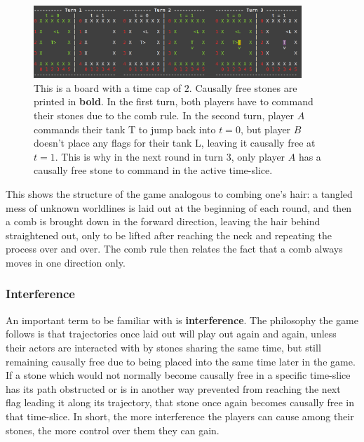 \documentclass[12pt]{article}
\begin{document}
	\begin{figure}[h]
\begin{center}

    \includegraphics[width=0.9\textwidth]{images/diag_rule_of_combing}
 \caption{This is a board with a time cap of $2$. Causally free stones are printed in \textbf{bold}. In the first turn, both players have to command their stones due to the comb rule. In the second turn, player $A$ commands their tank T to jump back into $t=0$, but player $B$ doesn't place any flags for their tank L, leaving it causally free at $t=1$. This is why in the next round in turn 3, only player $A$ has a causally free stone to command in the active time-slice.}\label{fig:comb rule}
\end{center}
\end{figure}
	
	This shows the structure of the game analogous to combing one's hair: a tangled mess of unknown worldlines is laid out at the beginning of each round, and then a comb is brought down in the forward direction, leaving the hair behind straightened out, only to be lifted after reaching the neck and repeating the process over and over. The comb rule then relates the fact that a comb always moves in one direction only.
	
	\subsubsection{Interference}
	An important term to be familiar with is \textbf{interference}. The philosophy the game follows is that trajectories once laid out will play out again and again, unless their actors are interacted with by stones sharing the same time, but still remaining causally free due to being placed into the same time later in the game. If a stone which would not normally become causally free in a specific time-slice has its path obstructed or is in another way prevented from reaching the next flag leading it along its trajectory, that stone once again becomes causally free in that time-slice. In short, the more interference the players can cause among their stones, the more control over them they can gain.
	
\end{document}
